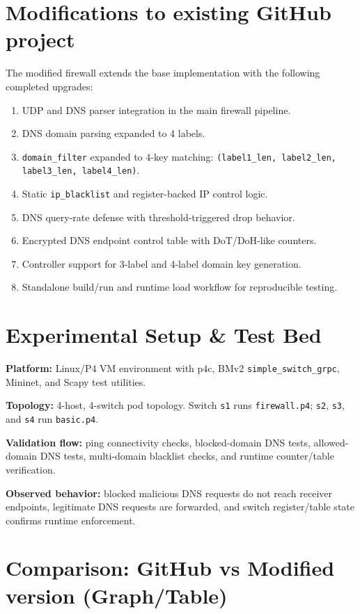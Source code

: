 \documentclass[sigconf,nonacm]{acmart}
\begin{document}
\section{Modifications to existing GitHub project}
The modified firewall extends the base implementation with the following
completed upgrades:
\begin{enumerate}
  \item UDP and DNS parser integration in the main firewall pipeline.
  \item DNS domain parsing expanded to 4 labels.
  \item \texttt{domain\_filter} expanded to 4-key matching:
  \texttt{(label1\_len, label2\_len, label3\_len, label4\_len)}.
  \item Static \texttt{ip\_blacklist} and register-backed IP control logic.
  \item DNS query-rate defense with threshold-triggered drop behavior.
  \item Encrypted DNS endpoint control table with DoT/DoH-like counters.
  \item Controller support for 3-label and 4-label domain key generation.
  \item Standalone build/run and runtime load workflow for reproducible testing.
\end{enumerate}

\section{Experimental Setup \& Test Bed}
\textbf{Platform:} Linux/P4 VM environment with p4c, BMv2
\texttt{simple\_switch\_grpc}, Mininet, and Scapy test utilities.

\textbf{Topology:} 4-host, 4-switch pod topology. Switch \texttt{s1} runs
\texttt{firewall.p4}; \texttt{s2}, \texttt{s3}, and \texttt{s4} run
\texttt{basic.p4}.

\textbf{Validation flow:} ping connectivity checks, blocked-domain DNS tests,
allowed-domain DNS tests, multi-domain blacklist checks, and runtime
counter/table verification.

\textbf{Observed behavior:} blocked malicious DNS requests do not reach receiver
endpoints, legitimate DNS requests are forwarded, and switch register/table
state confirms runtime enforcement.


\section{Comparison: GitHub vs Modified version (Graph/Table)}
\end{document}
